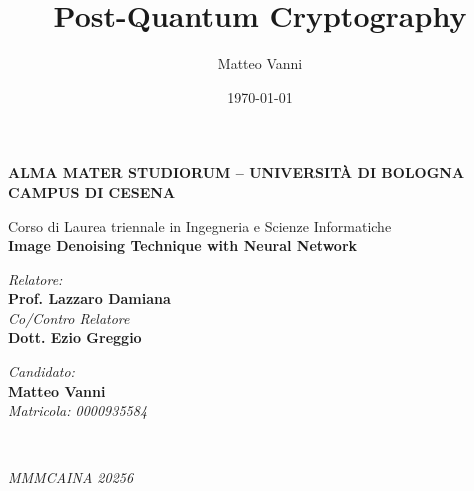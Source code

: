 \documentclass[12pt,a4paper,openright,twoside]{book}
\begin{document}
\title{Post-Quantum Cryptography}
\author{Matteo Vanni}
\date{\today}
 
\begin{titlepage}
\begin{center}
 
    \large
    \textbf{ALMA MATER STUDIORUM -- UNIVERSITÀ DI BOLOGNA\\CAMPUS DI CESENA}
\\
    \noindent\hrulefill
    \vspace{0.4cm}
 
    \Large
    Corso di Laurea triennale in Ingegneria e Scienze Informatiche\\
 
    \Huge
    \vspace{4.5cm}
    \Large
    \textbf{
        Image Denoising Technique with Neural Network
   }
 
    \large
    \vspace{1cm}
 
    \vspace{5.5cm}
    \begin{minipage}[t]{0.64\textwidth}
      \begin{flushleft}
        \textit{Relatore:}\\
        \textbf{Prof. Lazzaro Damiana}
        \\
        \vspace{0.4cm}
        \textit{Co/Contro Relatore}\\
        \textbf{Dott. Ezio Greggio}
      \end{flushleft}
    \end{minipage}
    \begin{minipage}[t]{0.34\textwidth}
      
      \begin{flushright}
        \textit{Candidato:}\\
        \textbf{Matteo Vanni}
\\
        \textit{Matricola: 0000935584}
      \end{flushright}

    \end{minipage}\\
 
    \vfill
    \noindent\hrulefill

    \textit{MMMCAINA 20256}
    \vspace{0.3cm}
    \Large
 
  \end{center}
\end{titlepage}
 
\end{document}
